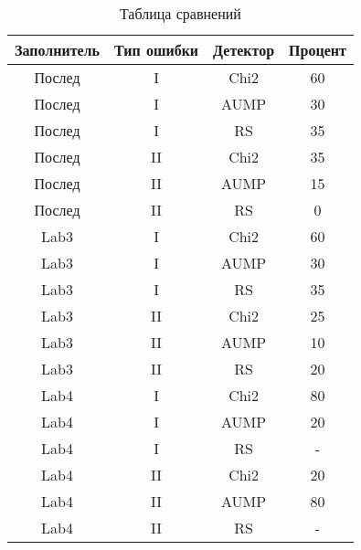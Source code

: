 \documentclass[12pt, a4paper, english, russian]{article}
\begin{document}
\begin{table}[H]
	\centering
	\begin{tabular}{c|c|c|c}
		Заполнитель & Тип ошибки & Детектор & Процент \\
		\hline
		Послед      & I          & Chi2     & 60      \\
		Послед      & I          & AUMP     & 30      \\
		Послед      & I          & RS       & 35      \\
		\hline
		Послед      & II         & Chi2     & 35      \\
		Послед      & II         & AUMP     & 15      \\
		Послед      & II         & RS       & 0       \\
		\hline
		Lab3        & I          & Chi2     & 60      \\
		Lab3        & I          & AUMP     & 30      \\
		Lab3        & I          & RS       & 35      \\
		\hline
		Lab3        & II         & Chi2     & 25      \\
		Lab3        & II         & AUMP     & 10      \\
		Lab3        & II         & RS       & 20      \\
		\hline
		Lab4        & I          & Chi2     & 80      \\
		Lab4        & I          & AUMP     & 20      \\
		Lab4        & I          & RS       & -       \\
		\hline
		Lab4        & II         & Chi2     & 20      \\
		Lab4        & II         & AUMP     & 80      \\
		Lab4        & II         & RS       & -
	\end{tabular}
	\caption{Таблица сравнений}
\end{table}
\end{document}
